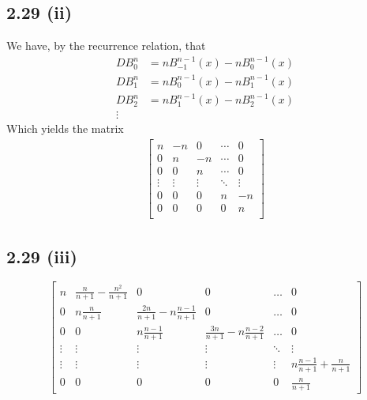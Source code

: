 \documentclass[letterpaper,12pt]{article}
\theoremstyle{definition}
\begin{document}
\subsection*{2.29 (ii)}
We have, by the recurrence relation, that
\begin{align*}
    DB_0^n&=  n B^{n-1}_{-1}(x) - n B_0^{n-1}(x) \\
    DB_1^n&=  n B^{n-1}_{0}(x) - n B_1^{n-1}(x)  \\
    DB_2^n&=  n B^{n-1}_{1}(x) - n B_2^{n-1}(x)  \\
    \vdots
\end{align*}
Which yields the matrix
\begin{align*}
    \begin{bmatrix}
        n & -n & 0 & \cdots & 0 \\
        0 & n & -n & \cdots & 0 \\
        0 & 0 & n & \cdots & 0 \\
        \vdots & \vdots & \vdots & \ddots & \vdots\\
        0 & 0 & 0 & n  & -n \\
        0 & 0 & 0 & 0 & n \\
    \end{bmatrix}
\end{align*}


\subsection*{2.29 (iii)}

\[
\begin{bmatrix}
    n & \frac{n}{n+1} - \frac{n^2}{n+1} & 0 & 0 & \dots & 0\\
    0 & n\frac{n}{n+1} &  \frac{2n}{n+1} - n \frac{n-1}{n+1} & 0 & \dots & 0\\
    0 & 0 & n\frac{n-1}{n+1} & \frac{3n}{n+1} - n \frac{n-2}{n+1}&  \dots & 0\\
    \vdots&\vdots&\vdots&\vdots&\ddots&\vdots\\
    \vdots&\vdots&\vdots&\vdots&\vdots&n \frac{n-1}{n+1} + \frac{n}{n+1}\\
    0&0&0&0&0& \frac{n}{n+1}
\end{bmatrix}
\]
\end{document}
